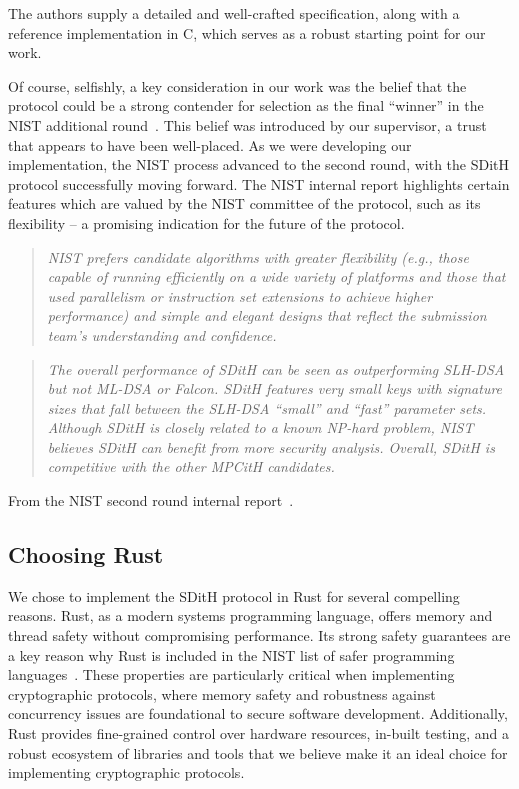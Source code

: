 \documentclass[11pt]{report}
\theoremstyle{definition}
\theoremstyle{plain}
\begin{document}
The authors supply a detailed and well-crafted specification, along with a reference implementation in C, which serves as a robust starting point for our work.

Of course, selfishly, a key consideration in our work was the belief that the protocol could be a strong contender for selection as the final ``winner'' in the NIST additional round~\cite{nistcall}. This belief was introduced by our supervisor, a trust that appears to have been well-placed. As we were developing our implementation, the NIST process advanced to the second round, with the SDitH protocol successfully moving forward. The NIST internal report highlights certain features which are valued by the NIST committee of the protocol, such as its flexibility  -- a promising indication for the future of the protocol.

\begin{quote}
  \textit{NIST prefers candidate algorithms with greater flexibility (e.g., those capable of running efficiently on a wide variety of platforms and those that used parallelism or instruction set extensions to achieve higher performance) and simple and elegant designs that reflect the submission team's understanding and confidence.}
\end{quote}

\begin{quote}
  \textit{The overall performance of SDitH can be seen as outperforming SLH-DSA but not ML-DSA or Falcon. SDitH features very small keys with signature sizes that fall between the SLH-DSA ``small'' and ``fast'' parameter sets. Although SDitH is closely related to a known NP-hard problem, NIST believes SDitH can benefit from more security analysis. Overall, SDitH is competitive with the other MPCitH candidates.}
\end{quote}

From the NIST second round internal report~\cite{alagic2024status}.

\subsection{Choosing Rust}
We chose to implement the SDitH protocol in Rust for several compelling reasons. Rust, as a modern systems programming language, offers memory and thread safety without compromising performance. Its strong safety guarantees\cite{jung2017rustbelt} are a key reason why Rust is included in the NIST list of safer programming languages~\cite{nistsaferlanguages}. These properties are particularly critical when implementing cryptographic protocols, where memory safety and robustness against concurrency issues are foundational to secure software development. Additionally, Rust provides fine-grained control over hardware resources, in-built testing, and a robust ecosystem of libraries and tools that we believe make it an ideal choice for implementing cryptographic protocols.
\end{document}
